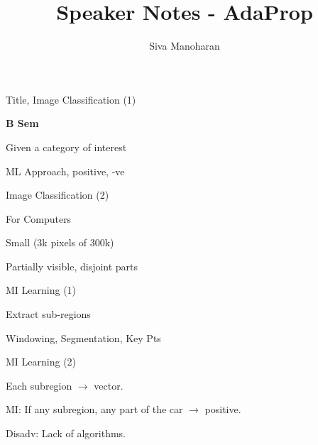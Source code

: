 \documentclass[13pt,handout]{beamer}
\author{Siva Manoharan}
\title{Speaker Notes - AdaProp}
\newenvironment{wideitemize}{\itemize\addtolength{\itemsep}{20pt}}{\enditemize}
\begin{document}
\Huge


\begin{frame}{Title, Image Classification (1)}
    \begin{wideitemize}
    \item {\bf B Sem}
    \item Given a category of interest
    \item ML Approach, positive, -ve
    \end{wideitemize}
\end{frame}

\begin{frame}{Image Classification (2)}
    \begin{wideitemize}
    \item For Computers
    \item Small (3k pixels of 300k)
    \item Partially visible, disjoint parts
    \end{wideitemize}
\end{frame}


\begin{frame}{MI Learning (1)}
    \begin{wideitemize}
    \item Extract sub-regions
    \item Windowing, Segmentation, Key Pts
    \end{wideitemize}
\end{frame}

\begin{frame}{MI Learning (2)}
\begin{wideitemize}
    \item Each subregion $\to$ vector.
    \item MI: If any subregion, any part of the car $\to$ positive.
    \item Disadv: Lack of algorithms.
\end{wideitemize}
\end{frame}
\end{document}
